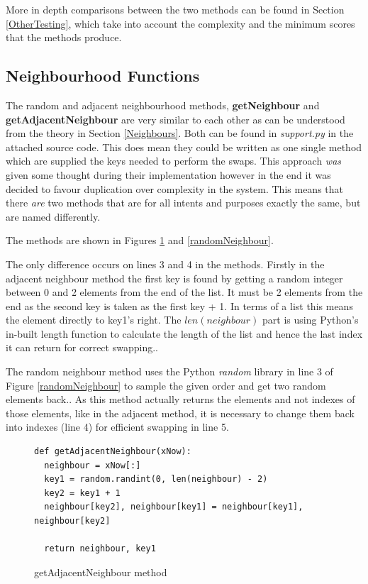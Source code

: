 \documentclass[12pt]{report}
\begin{document}
More in depth comparisons between the two methods can be found in Section \ref{OtherTesting}, which take into account the complexity and the minimum scores that the methods produce.

\subsection{Neighbourhood Functions}\label{Imp-Neighbours}
The random and adjacent neighbourhood methods, \textbf{getNeighbour} and \textbf{getAdjacentNeighbour} are very similar to each other as can be understood from the theory in Section \ref{Neighbours}. Both can be found in \textit{support.py}  in the attached source code. This does mean they could be written as one single method which are supplied the keys needed to perform the swaps. This approach \textit{was} given some thought during their implementation however in the end it was decided to favour duplication over complexity in the system. This means that there \textit{are} two methods that are for all intents and purposes exactly the same, but are named differently.

The methods are shown in Figures \ref{adjacentNeighbour} and \ref{randomNeighbour}.

The only difference occurs on lines 3 and 4 in the methods. Firstly in the adjacent neighbour method the first key is found by getting a random integer between 0 and 2 elements from the end of the list. It must be 2 elements from the end as the second key is taken as the first key + 1. In terms of a list this means the element directly to key1's right. The $len(neighbour)$ part is using Python's in-built length function to calculate the length of the list and hence the last index it can return for correct swapping.\cite{PythonLen}.

The random neighbour method uses the Python \textit{random} library in line 3 of Figure \ref{randomNeighbour} to sample the given order and get two random elements back.\cite{PythonSample}. As this method actually returns the elements and not indexes of those elements, like in the adjacent method, it is necessary to change them back into indexes (line 4) for efficient swapping in line 5.

\begin{figure}[H]
\caption{getAdjacentNeighbour method}
\label{adjacentNeighbour}
\begin{lstlisting}
def getAdjacentNeighbour(xNow):
  neighbour = xNow[:]
  key1 = random.randint(0, len(neighbour) - 2)
  key2 = key1 + 1
  neighbour[key2], neighbour[key1] = neighbour[key1], neighbour[key2]
    
  return neighbour, key1
\end{lstlisting}
\end{figure}
\end{document}
